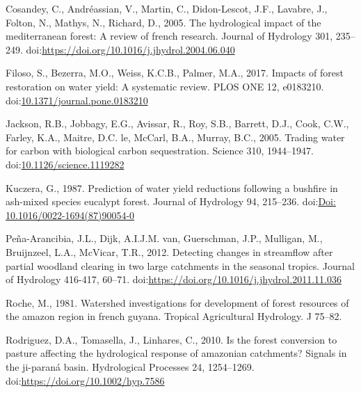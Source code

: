 \documentclass[]{elsarticle} %
\begin{document}
\leavevmode\hypertarget{ref-cosandey2005}{}%
Cosandey, C., Andréassian, V., Martin, C., Didon-Lescot, J.F., Lavabre,
J., Folton, N., Mathys, N., Richard, D., 2005. The hydrological impact
of the mediterranean forest: A review of french research. Journal of
Hydrology 301, 235--249.
doi:\href{https://doi.org/https://doi.org/10.1016/j.jhydrol.2004.06.040}{https://doi.org/10.1016/j.jhydrol.2004.06.040}

\leavevmode\hypertarget{ref-filoso2017}{}%
Filoso, S., Bezerra, M.O., Weiss, K.C.B., Palmer, M.A., 2017. Impacts of
forest restoration on water yield: A systematic review. PLOS ONE 12,
e0183210.
doi:\href{https://doi.org/10.1371/journal.pone.0183210}{10.1371/journal.pone.0183210}

\leavevmode\hypertarget{ref-jackson2005}{}%
Jackson, R.B., Jobbagy, E.G., Avissar, R., Roy, S.B., Barrett, D.J.,
Cook, C.W., Farley, K.A., Maitre, D.C. le, McCarl, B.A., Murray, B.C.,
2005. Trading water for carbon with biological carbon sequestration.
Science 310, 1944--1947.
doi:\href{https://doi.org/10.1126/science.1119282}{10.1126/science.1119282}

\leavevmode\hypertarget{ref-kuczera1987}{}%
Kuczera, G., 1987. Prediction of water yield reductions following a
bushfire in ash-mixed species eucalypt forest. Journal of Hydrology 94,
215--236.
doi:\href{https://doi.org/Doi:\%2010.1016/0022-1694(87)90054-0}{Doi: 10.1016/0022-1694(87)90054-0}

\leavevmode\hypertarget{ref-pena-arancibia2012}{}%
Peña-Arancibia, J.L., Dijk, A.I.J.M. van, Guerschman, J.P., Mulligan,
M., Bruijnzeel, L.A., McVicar, T.R., 2012. Detecting changes in
streamflow after partial woodland clearing in two large catchments in
the seasonal tropics. Journal of Hydrology 416-417, 60--71.
doi:\href{https://doi.org/https://doi.org/10.1016/j.jhydrol.2011.11.036}{https://doi.org/10.1016/j.jhydrol.2011.11.036}

\leavevmode\hypertarget{ref-roche1981}{}%
Roche, M., 1981. Watershed investigations for development of forest
resources of the amazon region in french guyana. Tropical Agricultural
Hydrology. J 75--82.

\leavevmode\hypertarget{ref-rodriguez2010}{}%
Rodriguez, D.A., Tomasella, J., Linhares, C., 2010. Is the forest
conversion to pasture affecting the hydrological response of amazonian
catchments? Signals in the ji-paraná basin. Hydrological Processes 24,
1254--1269.
doi:\href{https://doi.org/https://doi.org/10.1002/hyp.7586}{https://doi.org/10.1002/hyp.7586}
\end{document}
